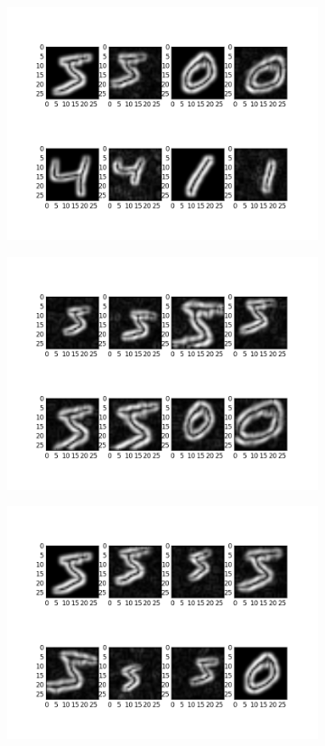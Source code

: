 \begin{figure}
\begin{subfigure}{0.5\textwidth}
		\includegraphics[width=1\linewidth]{figures/1-1.png}
		\caption{}
	\end{subfigure}%
	\begin{subfigure}{0.5\textwidth}
		\centering
		\includegraphics[width=1\linewidth]{figures/0-6.png}
		\caption{}
	\end{subfigure}
	\begin{subfigure}{0.5\textwidth}
		\centering
		\includegraphics[width=1\linewidth]{figures/1-6.png}

\end{subfigure}
\end{figure}

